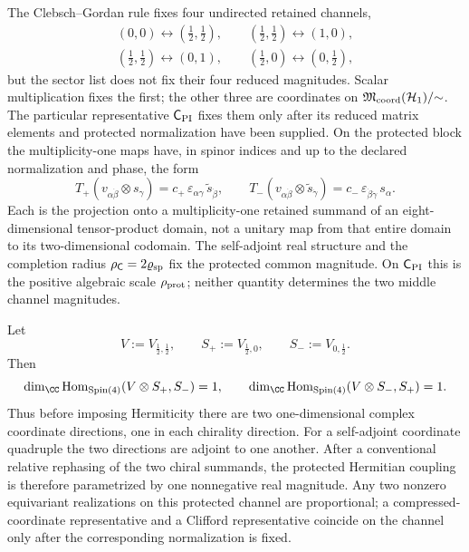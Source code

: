 \documentclass[11pt]{article}
\begin{document}
\begin{remark}
\label{p1:rem:s3one-coordinate-implementation-status}
The Clebsch--Gordan rule fixes four undirected retained channels,
\[
\begin{gathered}
 (0,0)\leftrightarrow(\tfrac12,\tfrac12),\qquad
 (\tfrac12,\tfrac12)\leftrightarrow(1,0),\\
 (\tfrac12,\tfrac12)\leftrightarrow(0,1),\qquad
 (\tfrac12,0)\leftrightarrow(0,\tfrac12),
\end{gathered}
\]
but the sector list does not fix their four reduced magnitudes.  Scalar
multiplication fixes the first; the other three are coordinates on
\(\mathfrak M_{\rm coord}(\mathcal H_1)/{\sim}\).  The particular
representative \(\mathsf C_{\rm PI}\) fixes them only after its reduced
matrix elements and protected normalization have been supplied.
On the protected block the multiplicity-one maps
have, in spinor indices and up to the declared normalization and phase, the
form
\[
 T_+(v_{\alpha\dot\beta}\otimes s_\gamma)
 =c_+\,\varepsilon_{\alpha\gamma}\,
   \widetilde s_{\dot\beta},
 \qquad
 T_-(v_{\alpha\dot\beta}\otimes\widetilde s_{\dot\gamma})
 =c_-\,\varepsilon_{\dot\beta\dot\gamma}\,s_\alpha.
\]
Each is the projection onto a multiplicity-one retained summand of an
eight-dimensional tensor-product domain, not a unitary map from that entire
domain to its two-dimensional codomain.  The self-adjoint real structure and
the completion radius \(\rho_{\mathsf C}=2\varrho_{\rm sp}\) fix the protected
common magnitude.  On \(\mathsf C_{\rm PI}\) this is the positive algebraic
scale \(\rho_{\rm prot}\); neither quantity determines the two middle channel
magnitudes.
\end{remark}

\begin{proposition}
\label{p1:prop:protected-coordinate-multiplicity-one}
Let
\[
 V:=V_{\frac12,\frac12},\qquad
 S_+:=V_{\frac12,0},\qquad S_-:=V_{0,\frac12}.
\]
Then
\[
 \dim_{\CC}\operatorname{Hom}_{\operatorname{Spin}(4)}(V\otimes S_+,S_-)=1,
 \qquad
 \dim_{\CC}\operatorname{Hom}_{\operatorname{Spin}(4)}(V\otimes S_-,S_+)=1.
\]
Thus before imposing Hermiticity there are two one-dimensional complex
coordinate directions, one in each chirality direction.  For a self-adjoint
coordinate quadruple the two directions are adjoint to one another.  After a
conventional relative rephasing of the two chiral summands, the protected
Hermitian coupling is therefore parametrized by one nonnegative real
magnitude.  Any two nonzero equivariant realizations on this protected channel
are proportional; a compressed-coordinate representative and a Clifford
representative coincide on the channel only after the corresponding
normalization is fixed.
\end{proposition}
\end{document}
